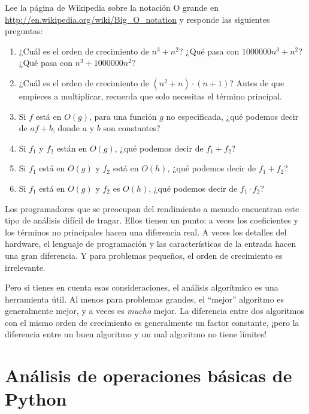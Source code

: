 \documentclass[10pt]{book}
\begin{document}
\begin{exercise}

Lee la página de Wikipedia sobre la notación O grande en
\url{http://en.wikipedia.org/wiki/Big_O_notation} y
responde las siguientes preguntas:

\begin{enumerate}
\item ¿Cuál es el orden de crecimiento de $n^3 + n^2$?
¿Qué pasa con $1000000 n^3 + n^2$?
¿Qué pasa con $n^3 + 1000000 n^2$?

\item ¿Cuál es el orden de crecimiento de $(n^2 + n) \cdot (n + 1)$?  Antes
  de que empieces a multiplicar, recuerda que solo necesitas el término principal.

\item Si $f$ está en $O(g)$, para una función $g$ no especificada, ¿qué podemos
  decir de $af+b$, donde $a$ y $b$ son constantes?

\item Si $f_1$ y $f_2$ están en $O(g)$, ¿qué podemos decir de $f_1 + f_2$?

\item Si $f_1$ está en $O(g)$
y $f_2$ está en $O(h)$,
¿qué podemos decir de $f_1 + f_2$?

\item Si $f_1$ está en $O(g)$ y $f_2$ es $O(h)$,
¿qué podemos decir de $f_1 \cdot f_2$?
\end{enumerate}

\end{exercise}

Los programadores que se preocupan del rendimiento a menudo encuentran este tipo de
análisis difícil de tragar.  Ellos tienen un punto: a veces los
coeficientes y los términos no principales hacen una diferencia real.
A veces los detalles del hardware, el lenguaje de programación y
las características de la entrada hacen una gran diferencia.  Y para problemas
pequeños, el orden de crecimiento es irrelevante.

Pero si tienes en cuenta esas consideraciones, el análisis algorítmico es una
herramienta útil.  Al menos para problemas grandes, el ``mejor'' algoritmo
es generalmente mejor, y a veces es {\em mucho} mejor.  La
diferencia entre dos algoritmos con el mismo orden de crecimiento es
generalmente un factor constante, ¡pero la diferencia entre un buen algoritmo
y un mal algoritmo no tiene límites!


\section{Análisis de operaciones básicas de Python}
\end{document}
